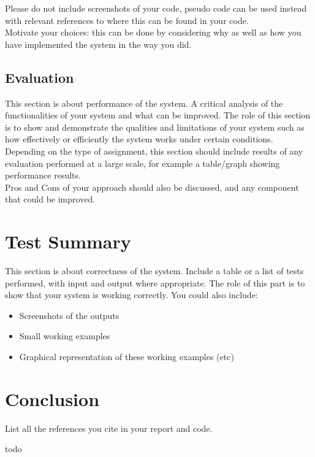 \documentclass[letterpaper,12pt]{article}
\begin{document}
Please do not include screenshots of your code, pseudo code can be used instead with relevant references to where this can be found in your code.\\

Motivate your choices: this can be done by considering why as well as how you have implemented the system in the way you did.

\subsection{Evaluation}

This section is about performance of the system. A critical analysis of the functionalities of your system and what can be improved. The role of this section is to show and demonstrate the qualities and limitations of your system such as how effectively or efficiently the system works under certain conditions.\\

Depending on the type of assignment, this section should include results of any evaluation performed at a large scale, for example a table/graph showing performance results.\\

Pros and Cons of your approach should also be discussed, and any component that could be improved.\\

\section{Test Summary}
\label{sec:test-summary}

This section is about correctness of the system. Include a table or a list of tests performed, with input and output where appropriate. The role of this part is to show that your system is working correctly. You could also include:

\begin{itemize}
    \item Screenshots of the outputs
    \item Small working examples
    \item Graphical representation of these working examples (etc)
\end{itemize}


\section{Conclusion}
\label{sec:conclusion}

List all the references you cite in your report and code.


\newpage
\begin{appendices}

todo

\end{appendices}
\end{document}
